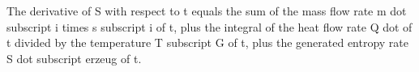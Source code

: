 The derivative of S with respect to t equals the sum of the mass flow rate m dot subscript i times s subscript i of t, plus the integral of the heat flow rate Q dot of t divided by the temperature T subscript G of t, plus the generated entropy rate S dot subscript erzeug of t.